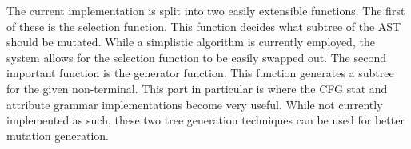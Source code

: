 The current implementation is split into two easily extensible
functions. The first of these is the selection function. This function
decides what subtree of the AST should be mutated. While a simplistic
algorithm is currently employed, the system allows for the selection
function to be easily swapped out. The second important function is
the generator function. This function generates a subtree for the
given non-terminal. This part in particular is where the CFG stat and
attribute grammar implementations become very useful. While not
currently implemented as such, these two tree generation techniques
can be used for better mutation generation.


